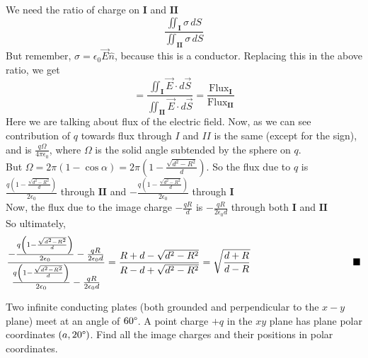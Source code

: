 \documentclass[../main.tex]{subfiles}
\begin{document}
\begin{questions}
\begin{solution}
\begin{center}
	\end{center}
	We need the ratio of charge on $\mathbf{I}$ and $\mathbf{II}$
	\begin{equation}
		\frac{\iint_\mathbf{I}\sigma\,dS}{\iint_\mathbf{II}\sigma\,dS}
	\end{equation}
	But remember, $\sigma = \epsilon_0\vec{E}\hat{n}$, because this is a conductor. Replacing this in the above ratio, we get
	\begin{equation}
		= \frac{\iint_\mathbf{I}\vec{E}\cdot d\vec{S}}{\iint_\mathbf{II}\vec{E}\cdot d\vec{S}} = \frac{\text{Flux}_{\mathbf{I}}}{\text{Flux}_{\mathbf{II}}}
	\end{equation}
	Here we are talking about flux of the electric field. Now, as we can see contribution of $q$ towards flux through $I$ and $II$ is the same (except for the sign), and is $\frac{q\Omega}{4\pi\epsilon_0}$, where $\Omega$ is the solid angle subtended by the sphere on $q$. \\
	But $\Omega = 2\pi(1-\cos\alpha) = 2\pi\left(1-\frac{\sqrt{d^2-R^2}}{d}\right)$. So the flux due to $q$ is $\frac{q\left(1-\frac{\sqrt{d^2-R^2}}{d}\right)}{2\epsilon_0}$ through $\mathbf{II}$ and $-\frac{q\left(1-\frac{\sqrt{d^2-R^2}}{d}\right)}{2\epsilon_0}$ through $\mathbf{I}$\\
	Now, the flux due to the image charge $-\frac{qR}{d}$ is $-\frac{qR}{2\epsilon_0d}$ through both $\mathbf{I}$ and $\mathbf{II}$ \\
	So ultimately,
	\begin{equation}
		\frac{-\frac{q\left(1-\frac{\sqrt{d^2-R^2}}{d}\right)}{2\epsilon_0} -\frac{qR}{2\epsilon_0d} }{\frac{q\left(1-\frac{\sqrt{d^2-R^2}}{d}\right)}{2\epsilon_0} - \frac{qR}{2\epsilon_0d}} = \frac{R + d - \sqrt{d^2-R^2}}{R - d + \sqrt{d^2 - R^2}} = \sqrt{\frac{d+R}{d-R}} \hskip0.3\textwidth\blacksquare
	\end{equation}
\end{solution}

\question Two infinite conducting plates (both grounded and perpendicular to the $x-y$ plane) meet at an angle of $60 \degree$. A point charge $+q$ in the $xy$ plane has plane polar coordinates $(a, 20 \degree)$. Find all the image charges and their positions in polar coordinates.
\begin{solution}
	\begin{center}
			\begin{tikzpicture}


\end{tikzpicture}
\end{center}
\end{solution}
\end{questions}
\end{document}
